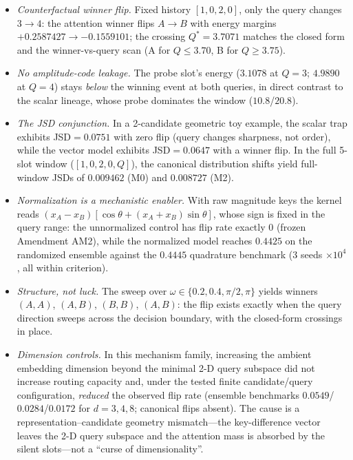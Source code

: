 \begin{itemize}
\item \emph{Counterfactual winner flip.} Fixed history
$[1,0,2,0]$, only the query changes $3\to4$: the attention winner flips
$A\to B$ with energy margins $+0.2587427\to-0.1559101$; the crossing
$Q^*=3.7071$ matches the closed form and the winner-vs-query scan
(A for $Q\le3.70$, B for $Q\ge3.75$).
\item \emph{No amplitude-code leakage.} The probe slot's energy
($3.1078$ at $Q=3$; $4.9890$ at $Q=4$) stays \emph{below} the winning
event at both queries, in direct contrast to the scalar lineage, whose
probe dominates the window ($10.8$/$20.8$).
\item \emph{The JSD conjunction.} In a 2-candidate geometric toy example,
the scalar trap exhibits JSD$=0.0751$ with zero flip (query changes
sharpness, not order), while the vector model exhibits JSD$=0.0647$ with
a winner flip. In the full 5-slot window ($[1,0,2,0,Q]$), the canonical
distribution shifts yield full-window JSDs of $0.009462$ (M0) and $0.008727$ (M2).
\item \emph{Normalization is a mechanistic enabler.} With raw magnitude
keys the kernel reads
$(x_A-x_B)[\cos\theta+(x_A+x_B)\sin\theta]$, whose sign is fixed in the
query range: the unnormalized control has flip rate exactly $0$ (frozen
Amendment AM2), while the normalized model reaches $0.4425$ on the
randomized ensemble against the $0.4445$ quadrature benchmark
(3 seeds $\times10^4$, all within criterion).
\item \emph{Structure, not luck.} The sweep over
$\omega\in\{0.2,\allowbreak0.4,\allowbreak\pi/2,\allowbreak\pi\}$ yields
winners $(A,A)$, $(A,B)$, $(B,B)$, $(A,B)$: the flip exists exactly when
the query direction sweeps across the decision boundary, with the
closed-form crossings in place.
\item \emph{Dimension controls.} In this mechanism family, increasing the
ambient embedding dimension beyond the minimal 2-D query subspace did not
increase routing capacity and, under the tested finite
candidate/query configuration, \emph{reduced} the observed flip rate
(ensemble benchmarks $0.0549$/$0.0284$/$0.0172$ for $d=3,4,8$; canonical
flips absent). The cause is a representation--candidate geometry
mismatch---the key-difference vector leaves the 2-D query subspace and the
attention mass is absorbed by the silent slots---not a ``curse of
dimensionality''.
\end{itemize}

